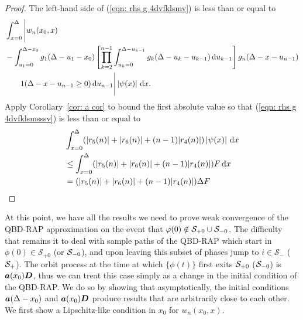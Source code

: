 \begin{proof}
	The left-hand side of (\ref{eqn: rhs g 4dvfklsmv}) is less than or equal to 
	\begin{align}
		&\int_{x=0}^\Delta \Bigg| w_n(x_0,x)  \nonumber 
		\\&{}- \int_{u_1=0}^{\Delta-x_0}g_1(\Delta - u_1 - x_0)
		\left[\prod_{k=2}^{n-1} \int_{u_k=0}^{\Delta-u_{k-1}} g_k(\Delta-u_k-u_{k-1})\, \mathrm{d} u_{k-1}\right] \nonumber 
            	g_{n}(\Delta - x-u_{n-1})
	\\&\qquad{} 1(\Delta-x-u_{n-1}\geq0) \, \mathrm{d} u_{n-1}\Bigg| \left|\psi(x)\right| \, \mathrm{d} x. \label{eqn: rhs g 4dvfklsmsssv}
	\end{align}
	Apply Corollary~\ref{cor: a cor} to bound the first absolute value so that (\ref{eqn: rhs g 4dvfklsmsssv}) is less than or equal to 
	\begin{align}
		&\int_{x=0}^\Delta (|r_5(n)| + |r_6(n)| + (n-1)|r_4(n)|) \left|\psi(x)\right| \, \mathrm{d} x \nonumber
		\\&\leq \int_{x=0}^\Delta(|r_5(n)| + |r_6(n)| + (n-1)|r_4(n)|) F \, \mathrm{d} x \nonumber 
		\\&= (|r_5(n)| + |r_6(n)| + (n-1)|r_4(n)|)\Delta F 
	\end{align}
\end{proof}

At this point, we have all the results we need to prove weak convergence of the QBD-RAP approximation on the event that \(\varphi(0)\notin \mathcal S_{+0}\cup\mathcal{S}_{-0}\). The difficulty that remains it to deal with sample paths of the QBD-RAP which start in \(\phi(0) \in \mathcal S_{+0}\) (or \(\mathcal{S}_{-0}\)), and upon leaving this subset of phases jump to \(i\in\mathcal S_{-}\) (\(\mathcal{S}_+\)). The orbit process at the time at which \(\{\phi(t)\}\) first exits \(\mathcal{S}_{+0}\) (\(\mathcal{S}_{-0}\)) is \(\boldsymbol a(x_0) \boldsymbol D\), thus we can treat this case simply as a change in the initial condition of the QBD-RAP. We do so by showing that asymptotically, the  initial conditions \(\boldsymbol a(\Delta-x_0)\) and \(\boldsymbol a(x_0)\boldsymbol D\) produce results that are arbitrarily close to each other. We first show a Lipschitz-like condition in \(x_0\) for \(w_n(x_0,x)\).

